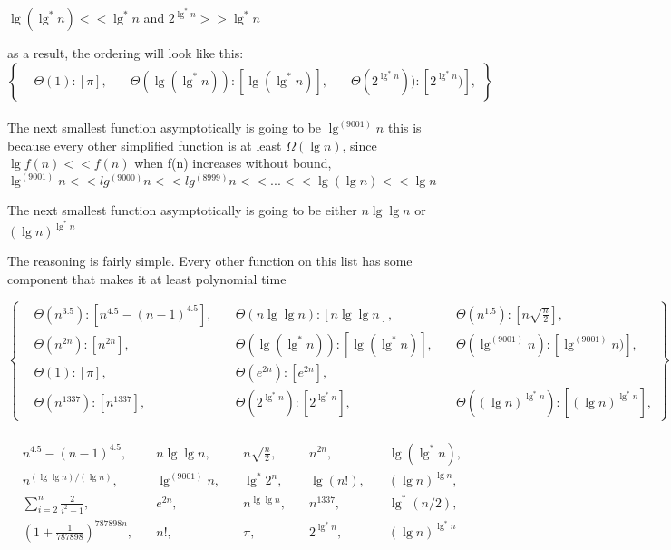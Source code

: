 \documentclass[11pt,fleqn]{article}
\theoremstyle{definition}
\theoremstyle{remark}
\begin{document}
$\lg(\lg^*n) << \lg^*n$ and $2^{\lg^*n} >> \lg^*n$

as a result, the ordering will look like this:\\

\[
\left\{
\begin{aligned}
& \Theta(1): [\pi],
& \quad \Theta(\lg(\lg^*n)): [\lg(\lg^*n)],
& \quad \Theta(2^{\lg^*n})): [2^{\lg^*n})],
\end{aligned}
\right\}
\]\\

The next smallest function asymptotically is going to be $\lg^{(9001)} n$
this is because every other simplified function is at least $\Omega(\lg n)$,
since $\lg{f(n)} << f(n)$ when f(n) increases without bound, 
$\lg^{(9001)} n << lg^{(9000)} n << lg^{(8999)} n << ... << \lg (\lg n) << \lg n$ 

The next smallest function asymptotically is going to be either
$n \lg \lg n$ or ${(\lg n)}^{\lg^*{n}}$

The reasoning is fairly simple. Every other function on this list 
has some component that makes it at least polynomial time

\[
\left\{
\begin{aligned}
& \Theta(n^{3.5}): [n^{4.5} - (n - 1)^{4.5}], 
& \quad \Theta(n \lg \lg n): [n \lg \lg n],
& \quad \Theta(n^{1.5}): [n\sqrt{\frac{n}{2}}],\\
& \Theta(n^{2n}): [n^{2n}],
& \quad \Theta(\lg(\lg^*n)): [\lg(\lg^*n)],
& \quad \Theta(\lg^{(9001)} n): [\lg^{(9001)} n)],\\
& \Theta(1): [\pi],
& \quad \Theta(e^{2n}): [e^{2n}],\\
& \Theta(n^{1337}): [n^{1337}],
& \quad \Theta(2^{\lg^*{n}}): [2^{\lg^*{n}}],
& \quad \Theta({(\lg n)}^{\lg^*{n}}): [{(\lg n)}^{\lg^*{n}}],
\end{aligned}
\right\}
\]\\


\[
\begin{aligned}
& n^{4.5} - (n - 1)^{4.5}, & \quad n \lg \lg n, & \quad n\sqrt{\frac{n}{2}}, & \quad n^{2n}, & \quad \lg(\lg^*n), \\
& n^{({\lg \lg n})/({\lg n})}, & \quad \lg^{(9001)} n, & \quad \lg^*2^{n}, & \quad \lg(n!), & \quad (\lg n)^{\lg n}, \\
& \sum_{i=2}^n \frac{2}{{i}^2-1}, & \quad e^{2n}, & \quad n^{\lg \lg n}, & \quad n^{1337}, & \quad \lg^*{(n/2)}, \\
& (1 + \frac{1}{787898})^{787898n}, & \quad n!, & \quad \pi, & \quad 2^{\lg^*n}, & \quad (\lg n)^{\lg^* n}
\end{aligned}
\]\\
\end{document}
